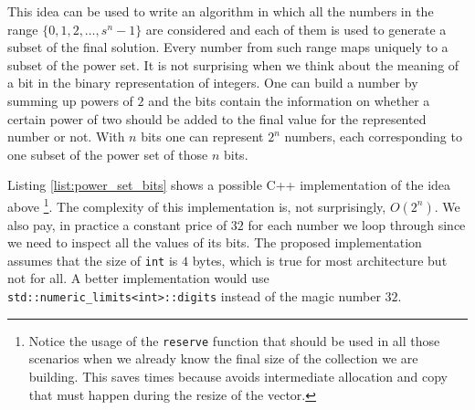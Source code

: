 This idea can be used to write an algorithm in which all the numbers in the range $\{0,1,2,\ldots,
s^n-1\}$ are considered and each of them is used to generate a subset of the final solution.
Every number from such range maps uniquely to a subset of the power set. It is not
surprising when we think about the meaning of a bit in the binary representation of integers. One
can build a number by summing up powers of $2$ and the bits contain the information on whether a
certain power of two should be added to the final value for the represented number or not. With $n$
bits one can represent $2^n$ numbers, each corresponding to one subset of the power set of those
$n$ bits.

Listing \ref{list:power_set_bits} shows  a possible C++ implementation of the idea above
\footnote{Notice the usage of the \texttt{reserve}
function that should be used in all those scenarios when we already know the final size of the
collection we are building. This saves times because avoids intermediate allocation and copy that
must happen during the resize of the vector.}.
The complexity of this implementation is, not
surprisingly, $O(2^n)$. We also pay, in practice a constant price of $32$ for each number we loop through
since we need to inspect all the values of its bits.
The proposed implementation
assumes that the size of \lstinline[columns=fixed]{int} is $4$ bytes, 
which is true for most architecture but not for all\cite{cit::std::fundamentaltypes}. A better
implementation would use \lstinline[columns=fixed]{std::numeric_limits<int>::digits} instead of
the magic number $32$.







